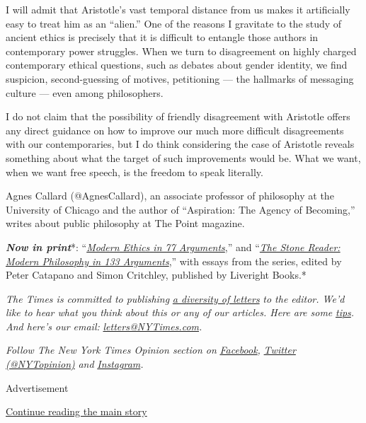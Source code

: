 I will admit that Aristotle's vast temporal distance from us makes it
artificially easy to treat him as an ``alien.'' One of the reasons I
gravitate to the study of ancient ethics is precisely that it is
difficult to entangle those authors in contemporary power struggles.
When we turn to disagreement on highly charged contemporary ethical
questions, such as debates about gender identity, we find suspicion,
second-guessing of motives, petitioning --- the hallmarks of messaging
culture --- even among philosophers.

I do not claim that the possibility of friendly disagreement with
Aristotle offers any direct guidance on how to improve our much more
difficult disagreements with our contemporaries, but I do think
considering the case of Aristotle reveals something about what the
target of such improvements would be. What we want, when we want free
speech, is the freedom to speak literally.

Agnes Callard (@AgnesCallard), an associate professor of philosophy at
the University of Chicago and the author of ``Aspiration: The Agency of
Becoming,'' writes about public philosophy at The Point magazine.

\emph{\textbf{Now in print}}*:
``\emph{\href{http://bitly.com/1MW2kN3}{\emph{Modern Ethics in 77
Arguments}}},'' and ``\emph{\href{http://bitly.com/1MW2kN3}{\emph{The
Stone Reader: Modern Philosophy in 133 Arguments}}},'' with essays from
the series, edited by Peter Catapano and Simon Critchley, published by
Liveright Books.*

\emph{The Times is committed to publishing}
\href{https://www.nytimes3xbfgragh.onion/2019/01/31/opinion/letters/letters-to-editor-new-york-times-women.html}{\emph{a
diversity of letters}} \emph{to the editor. We'd like to hear what you
think about this or any of our articles. Here are some}
\href{https://help.nytimes3xbfgragh.onion/hc/en-us/articles/115014925288-How-to-submit-a-letter-to-the-editor}{\emph{tips}}\emph{.
And here's our email:}
\href{mailto:letters@NYTimes.com}{\emph{letters@NYTimes.com}}\emph{.}

\emph{Follow The New York Times Opinion section on}
\href{https://www.facebookcorewwwi.onion/nytopinion}{\emph{Facebook}}\emph{,}
\href{http://twitter.com/NYTOpinion}{\emph{Twitter (@NYTopinion)}}
\emph{and}
\href{https://www.instagram.com/nytopinion/}{\emph{Instagram}}\emph{.}

Advertisement

\protect\hyperlink{after-bottom}{Continue reading the main story}

